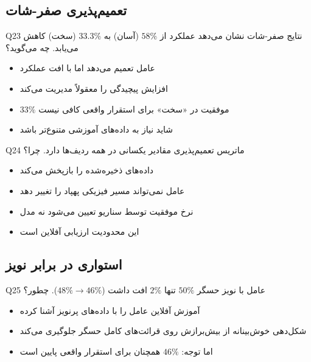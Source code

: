 \documentclass[oneside,openany,a4paper,12pt]{article}
\newcommand{\rsdrl}{\lr{RS-DRL}}
\begin{document}
\subsection{تعمیم‌پذیری صفر-شات}

\begin{questionbox}{Q23}
نتایج صفر-شات نشان می‌دهد عملکرد از $58\%$ (آسان) به $33.3\%$ (سخت) کاهش می‌یابد. چه می‌گوید؟
\end{questionbox}

\begin{hintbox}
\begin{itemize}
  \item عامل تعمیم می‌دهد اما با افت عملکرد
  \item افزایش پیچیدگی را معقولاً مدیریت می‌کند
  \item $33\%$ موفقیت در «سخت» برای استقرار واقعی کافی نیست
  \item شاید نیاز به داده‌های آموزشی متنوع‌تر باشد
\end{itemize}
\end{hintbox}

\begin{questionbox}{Q24}
ماتریس تعمیم‌پذیری مقادیر یکسانی در همه ردیف‌ها دارد. چرا؟
\end{questionbox}

\begin{hintbox}
\begin{itemize}
  \item {} داده‌های ذخیره‌شده را بازپخش می‌کند
  \item عامل نمی‌تواند مسیر فیزیکی پهپاد را تغییر دهد
  \item نرخ موفقیت توسط سناریو تعیین می‌شود نه مدل
  \item این محدودیت ارزیابی آفلاین است
\end{itemize}
\end{hintbox}

\subsection{استواری در برابر نویز}

\begin{questionbox}{Q25}
عامل با نویز حسگر $50\%$ تنها $2\%$ افت داشت ($48\% \to 46\%$). چطور؟
\end{questionbox}

\begin{hintbox}
\begin{itemize}
  \item آموزش آفلاین عامل را با داده‌های پرنویز آشنا کرده
  \item شکل‌دهی خوش‌بینانه \rsdrl{} از بیش‌برازش روی قرائت‌های کامل حسگر جلوگیری می‌کند
  \item اما توجه: $46\%$ همچنان برای استقرار واقعی پایین است
\end{itemize}
\end{hintbox}
\end{document}
